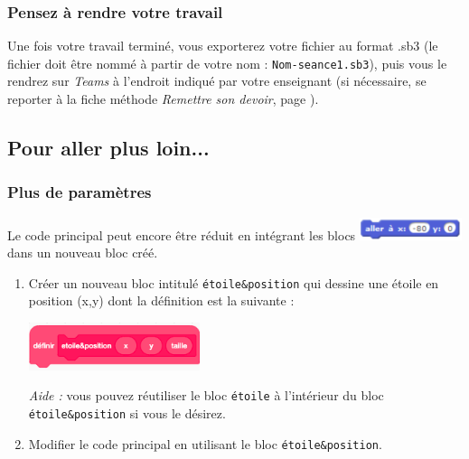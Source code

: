 
\subsubsection{Pensez à rendre votre travail}
Une fois votre travail terminé, vous exporterez votre fichier au format .sb3 (le fichier doit être nommé à partir de votre nom : \texttt{Nom-seance1.sb3}), puis vous le rendrez sur \emph{Teams} à l'endroit indiqué par votre enseignant (si nécessaire, se reporter à la fiche méthode \emph{Remettre son devoir}, page \pageref{TeamsRemettreDevoir}).

\subsection{Pour aller plus loin...}

\subsubsection{Plus de paramètres}

Le code principal peut encore être réduit en intégrant les blocs \includegraphics[width=3cm]{./images/scratch03/fonction/Scratch_Fonctions_11} dans un nouveau bloc créé.

\begin{enumerate}
\item Créer un nouveau bloc intitulé \texttt{étoile\&position} qui dessine une étoile en position (x,y) dont la définition est la suivante :
\begin{center}\includegraphics[width=5cm]{./images/scratch03/fonction/bloc_allerPlusLoin.png}\end{center}

\emph{Aide :} vous pouvez réutiliser le bloc \texttt{étoile} à l’intérieur du bloc \texttt{étoile\&position} si vous le désirez.

\item Modifier le code principal en utilisant le bloc \texttt{étoile\&position}.
\end{enumerate}

